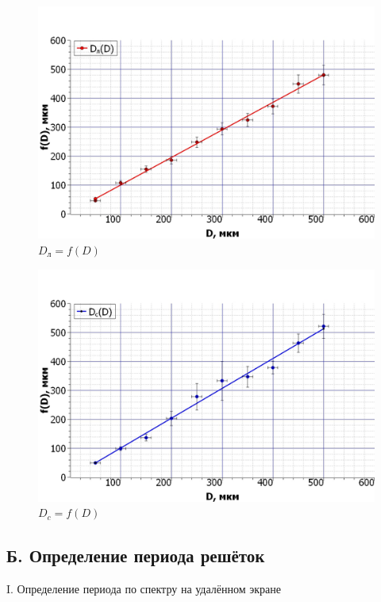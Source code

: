 \documentclass[a4paper,12pt]{article} %
\begin{document}
	\begin{figure}[h!]
		\centering
		\includegraphics[scale=0.6]{Pictures/График_Линза}
		\caption{$D_{\text{л}} = f(D)$}
	\end{figure}
	
	\begin{figure}[h!]
		\centering
		\includegraphics[scale=0.6]{Pictures/График_Спектр}
		\caption{$D_c = f(D)$}
	\end{figure}
	
	
	\subsection*{Б. Определение периода решёток}
	
	\begin{center}
			I. Определение периода по спектру на удалённом экране
	\end{center}
	
\end{document}
